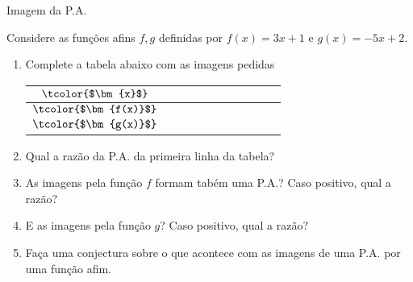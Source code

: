\begin{task}{Imagem da P.A.}

Considere as funções afins $f,g$ definidas por $f(x)=3x+1$ e $g(x)=-5x+2$.
\begin{enumerate}
\item Complete a tabela abaixo com as imagens pedidas

\begin{table}[H]
\centering
\begin{tabular}{|>{$}c<{$}|*{9}{c|}}
\hline
\tcolor{$\bm{x}$} & & & & & & & & & \\
\hline
\tcolor{$\bm{f(x)}$} & & & & & & & & & \\
\hline
\tcolor{$\bm{g(x)}$} & & & & & & & & & \\
\hline
\end{tabular}
\end{table}
\item Qual a razão da P.A. da primeira linha da tabela?
\item As imagens pela função $f$ formam tabém uma P.A.? Caso positivo, qual a razão?
\item E as imagens pela função $g$? Caso positivo, qual a razão?
\item Faça uma conjectura sobre o que acontece com as imagens de uma P.A. por uma função afim.
\end{enumerate}
\end{task}

